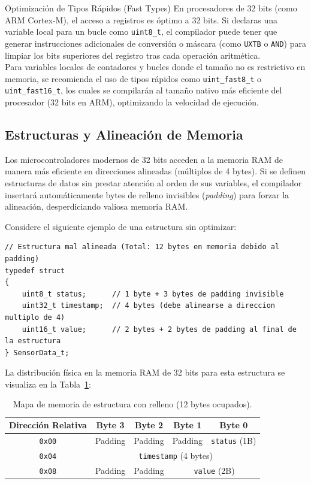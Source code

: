 \documentclass[
10pt, %
a4paper, %
oneside, %
headinclude,footinclude, %
BCOR5mm, %
]{scrartcl}
\begin{document}
\begin{InfoBox}{Optimización de Tipos Rápidos (Fast Types)}
	En procesadores de 32 bits (como ARM Cortex-M), el acceso a registros es óptimo a 32 bits. Si declaras una variable local para un bucle como \texttt{uint8\_t}, el compilador puede tener que generar instrucciones adicionales de conversión o máscara (como \texttt{UXTB} o \texttt{AND}) para limpiar los bits superiores del registro tras cada operación aritmética. \\
	Para variables locales de contadores y bucles donde el tamaño no es restrictivo en memoria, se recomienda el uso de tipos rápidos como \texttt{uint\_fast8\_t} o \texttt{uint\_fast16\_t}, los cuales se compilarán al tamaño nativo más eficiente del procesador (32 bits en ARM), optimizando la velocidad de ejecución.
\end{InfoBox}

\subsection{Estructuras y Alineación de Memoria}
Los microcontroladores modernos de 32 bits acceden a la memoria RAM de manera más eficiente en direcciones alineadas (múltiplos de 4 bytes). Si se definen estructuras de datos sin prestar atención al orden de sus variables, el compilador insertará automáticamente bytes de relleno invisibles (\textit{padding}) para forzar la alineación, desperdiciando valiosa memoria RAM.

Considere el siguiente ejemplo de una estructura sin optimizar:

\begin{lstlisting}[style=CMakeStyle]
// Estructura mal alineada (Total: 12 bytes en memoria debido al padding)
typedef struct
{
    uint8_t status;      // 1 byte + 3 bytes de padding invisible
    uint32_t timestamp;  // 4 bytes (debe alinearse a direccion multiplo de 4)
    uint16_t value;      // 2 bytes + 2 bytes de padding al final de la estructura
} SensorData_t;
\end{lstlisting}

La distribución física en la memoria RAM de 32 bits para esta estructura se visualiza en la Tabla~\ref{tab:padding_struct}:

\begin{table}[H]
	\centering
	\begin{tabular}{|c|c|c|c|c|}
		\hline
		\textbf{Dirección Relativa} & \textbf{Byte 3} & \textbf{Byte 2} & \textbf{Byte 1} & \textbf{Byte 0} \\
		\hline
		\texttt{0x00} & \cellcolor{gray!20}Padding & \cellcolor{gray!20}Padding & \cellcolor{gray!20}Padding & \texttt{status} (1B) \\
		\hline
		\texttt{0x04} & \multicolumn{4}{c|}{\texttt{timestamp} (4 bytes)} \\
		\hline
		\texttt{0x08} & \cellcolor{gray!20}Padding & \cellcolor{gray!20}Padding & \multicolumn{2}{c|}{\texttt{value} (2B)} \\
		\hline
	\end{tabular}
	\caption{Mapa de memoria de estructura con relleno (12 bytes ocupados).}\label{tab:padding_struct}
\end{table}
\end{document}
